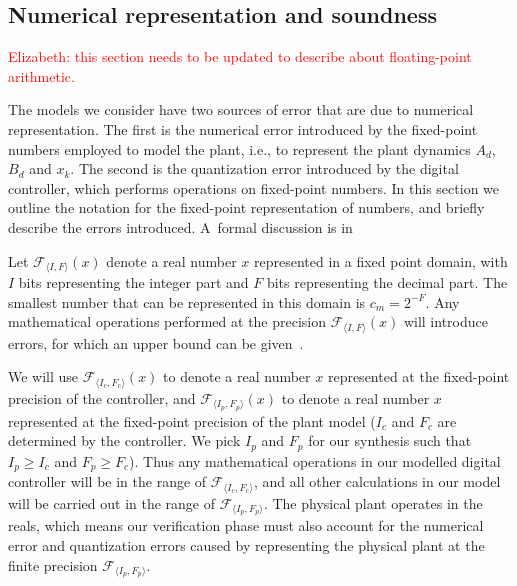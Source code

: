 \documentclass[twocolumn]{autart}    %
\begin{document}
\subsection{Numerical representation and soundness} 
\label{sec:numeric_rep}

\textcolor{red}{Elizabeth: this section needs to be updated to describe about floating-point arithmetic.}

The models we consider have two sources of error that are due to numerical  
representation.  The first is the numerical error introduced by the
fixed-point numbers employed to model the plant, i.e., to represent the
plant dynamics $A_d$, $B_d$ and $x_k$.  The second is the quantization error
introduced by the digital controller, which performs operations on
fixed-point numbers.  In this section we outline the notation for the
fixed-point representation of numbers, and briefly describe the errors
introduced.  A~formal discussion is in

Let $\mathcal{F}_{\langle I,F \rangle}(x)$ denote a real number $x$
represented in a fixed point domain, with $I$ bits representing the integer
part and $F$ bits representing the decimal part.  The smallest number that
can be represented in this domain is $c_m=2^{-F}$.  Any mathematical
operations performed at the precision $\mathcal{F}_{\langle I,F \rangle}(x)$
will introduce errors, for which an upper bound can be
given~\cite{DBLP:conf/arith/BrainTRW15}.

We will use $\mathcal{F}_{\langle I_c,F_c \rangle}(x)$ to denote a real
number $x$ represented at the fixed-point precision of the controller, and
$\mathcal{F}_{\langle I_p,F_p \rangle}(x)$ to denote a real number $x$
represented at the fixed-point precision of the plant model ($I_c$ and $F_c$
are determined by the controller.  We pick $I_p$ and $F_p$ for our synthesis
such that $I_p \geq I_c$ and $\allowbreak F_p \geq F_c$).  Thus any
mathematical operations in our modelled digital controller will be in the
range of $\mathcal{F}_{\langle I_c,F_c \rangle}$, and all other calculations
in our model will be carried out in the range of $\mathcal{F}_{\langle
I_p,F_p \rangle}$.  The physical plant operates in the reals, which means
our verification phase must also account for the numerical error and
quantization errors caused by representing the physical plant at the finite
precision $\mathcal{F}_{\langle I_p,F_p \rangle}$.
\end{document}

